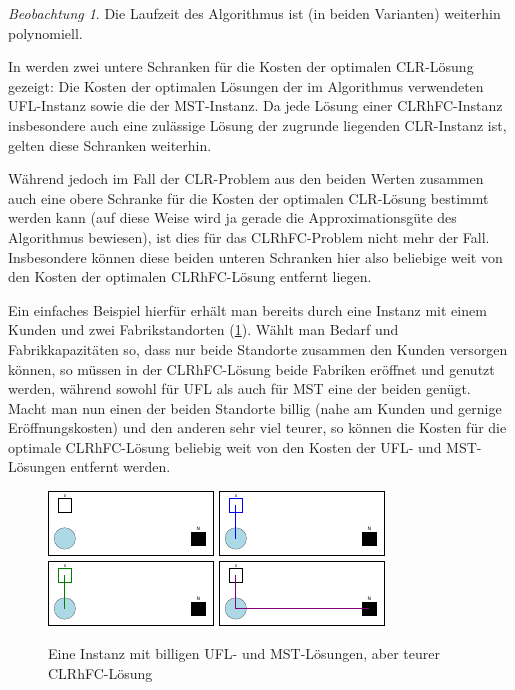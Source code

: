 \documentclass[a4paper,ngerman,11pt,bibtotoc]{scrartcl}
\theoremstyle{definition}
\theoremstyle{plain}
\theoremstyle{remark}
\newtheorem{beob}[defn]{Beobachtung}
\newcommand{\CLR}{CLR}
\newcommand{\CLRHFC}{CLRhFC}
\newcommand{\MST}{MST}
\newcommand{\UFL}{UFL}
\begin{document}
	\begin{beob}
		Die Laufzeit des Algorithmus ist (in beiden Varianten) weiterhin polynomiell. 
	\end{beob}
	
	In \cite{AAfCLR} werden zwei untere Schranken für die Kosten der optimalen \CLR-Lösung gezeigt: Die Kosten der optimalen Lösungen der im Algorithmus verwendeten \UFL-Instanz sowie die der \MST-Instanz. Da jede Lösung einer \CLRHFC-Instanz insbesondere auch eine zulässige Lösung der zugrunde liegenden \CLR-Instanz ist, gelten diese Schranken weiterhin.
	
	Während jedoch im Fall der \CLR-Problem aus den beiden Werten zusammen auch eine obere Schranke für die Kosten der optimalen \CLR-Lösung bestimmt werden kann (auf diese Weise wird ja gerade die Approximationsgüte des Algorithmus bewiesen), ist dies für das \CLRHFC-Problem nicht mehr der Fall. Insbesondere können diese beiden unteren Schranken hier also beliebige weit von den Kosten der optimalen \CLRHFC-Lösung entfernt liegen.
	
	Ein einfaches Beispiel hierfür erhält man bereits durch eine Instanz mit einem Kunden und zwei Fabrikstandorten (\cref{fig:bsp:schlechteUntereSchranken}). Wählt man Bedarf und Fabrikkapazitäten so, dass nur beide Standorte zusammen den Kunden versorgen können, so müssen in der \CLRHFC-Lösung beide Fabriken eröffnet und genutzt werden, während sowohl für \UFL{} als auch für \MST{} eine der beiden genügt. Macht man nun einen der beiden Standorte billig (nahe am Kunden und gernige Eröffnungskosten) und den anderen sehr viel teurer, so können die Kosten für die optimale \CLRHFC-Lösung beliebig weit von den Kosten der \UFL- und \MST-Lösungen entfernt werden.
	
	\begin{figure}[h]\centering
		\includegraphics[width=.24\textwidth]{bilder/beispiele/bsp1-instance.pdf}
		\includegraphics[width=.24\textwidth]{bilder/beispiele/bsp1-UFL.pdf}
		\includegraphics[width=.24\textwidth]{bilder/beispiele/bsp1-Tree.pdf}
		\includegraphics[width=.24\textwidth]{bilder/beispiele/bsp1-tours.pdf}
		\caption{Eine Instanz mit billigen \UFL- und \MST-Lösungen, aber teurer \CLRHFC-Lösung}\label{fig:bsp:schlechteUntereSchranken}
	\end{figure}
		
\end{document}
